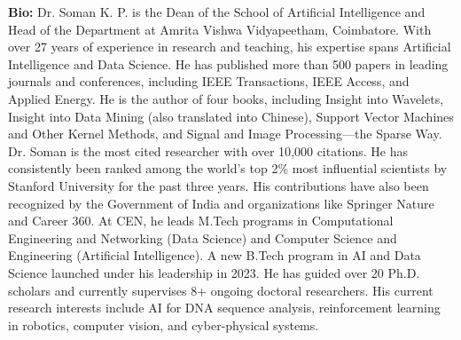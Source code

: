 \documentclass[11pt,oneside]{book}
\begin{document}
    \textbf{Bio:} Dr. Soman K. P. is the Dean of the School of Artificial Intelligence and Head of the Department at Amrita Vishwa Vidyapeetham, Coimbatore. With over 27 years of experience in research and teaching, his expertise spans Artificial Intelligence and Data Science. He has published more than 500 papers in leading journals and conferences, including IEEE Transactions, IEEE Access, and Applied Energy. He is the author of four books, including Insight into Wavelets, Insight into Data Mining (also translated into Chinese), Support Vector Machines and Other Kernel Methods, and Signal and Image Processing—the Sparse Way. Dr. Soman is the most cited researcher with over 10,000 citations. He has consistently been ranked among the world’s top 2\% most influential scientists by Stanford University for the past three years. His contributions have also been recognized by the Government of India and organizations like Springer Nature and Career 360. At CEN, he leads M.Tech programs in Computational Engineering and Networking (Data Science) and Computer Science and Engineering (Artificial Intelligence). A new B.Tech program in AI and Data Science launched under his leadership in 2023. He has guided over 20 Ph.D. scholars and currently supervises 8+ ongoing doctoral researchers. His current research interests include AI for DNA sequence analysis, reinforcement learning in robotics, computer vision, and cyber-physical systems.
  \newpage
  


\end{document}
